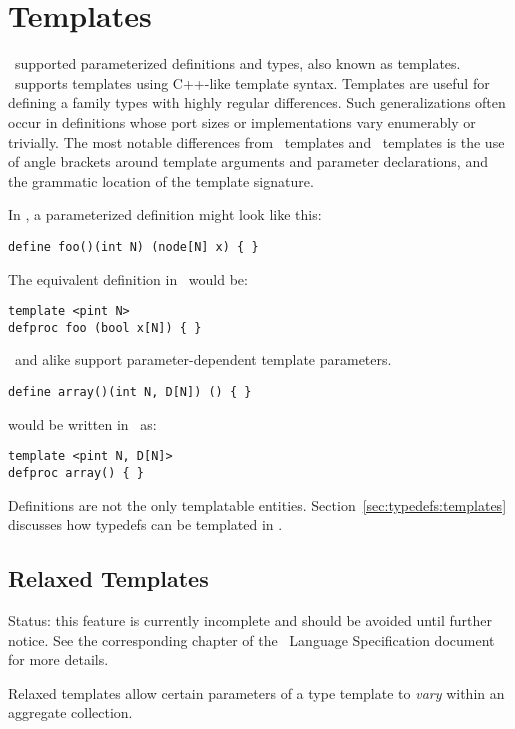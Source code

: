 
\section{Templates}
\label{sec:templates}

\CAST\ supported parameterized definitions and types, also known as templates.
\hac\ supports templates using C++-like template syntax.  
Templates are useful for defining a family types with 
highly regular differences.  
Such generalizations often occur in definitions whose 
port sizes or implementations vary enumerably or trivially.  
The most notable differences from \CAST\ templates and \hac\ templates
is the use of angle brackets around template arguments 
and parameter declarations, and the grammatic location of the 
template signature.  

In \CAST, a parameterized definition might look like this:

\begin{verbatim}
define foo()(int N) (node[N] x) { }
\end{verbatim}

The equivalent definition in \hac\ would be:

\begin{verbatim}
template <pint N>
defproc foo (bool x[N]) { }
\end{verbatim}

\CAST\ and \hac alike support parameter-dependent template parameters.

\begin{verbatim}
define array()(int N, D[N]) () { }
\end{verbatim}

\noindent
would be written in \hac\ as:

\begin{verbatim}
template <pint N, D[N]>
defproc array() { }
\end{verbatim}

Definitions are not the only templatable entities.  
Section~\ref{sec:typedefs:templates} discusses how typedefs 
can be templated in \hac.  

\subsection{Relaxed Templates}
\label{sec:templates:relaxed}

Status: this feature is currently incomplete and should be avoided
until further notice.  
See the corresponding chapter of the \hac\ Language Specification
document for more details.  

Relaxed templates allow certain parameters of a type template
to \emph{vary} within an aggregate collection.  


